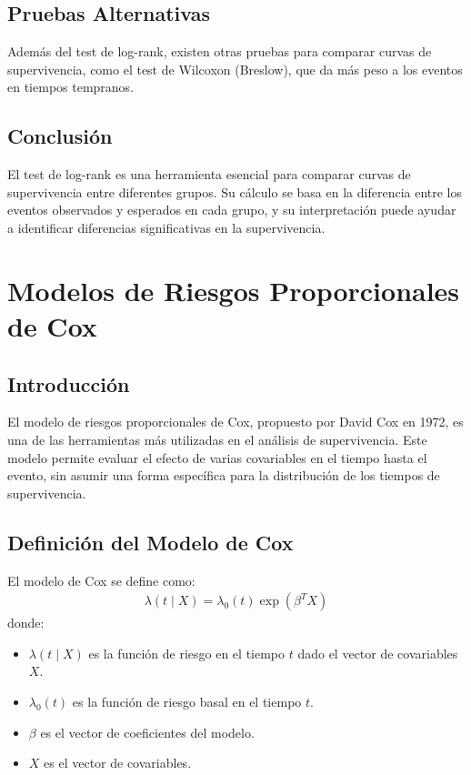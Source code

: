 \documentclass[a4paper]{report} %
\begin{document}
\section{Pruebas Alternativas}
Adem\'as del test de log-rank, existen otras pruebas para comparar curvas de supervivencia, como el test de Wilcoxon (Breslow), que da m\'as peso a los eventos en tiempos tempranos.

\section{Conclusi\'on}
El test de log-rank es una herramienta esencial para comparar curvas de supervivencia entre diferentes grupos. Su c\'alculo se basa en la diferencia entre los eventos observados y esperados en cada grupo, y su interpretaci\'on puede ayudar a identificar diferencias significativas en la supervivencia.



\chapter{Modelos de Riesgos Proporcionales de Cox}

\section{Introducci\'on}
El modelo de riesgos proporcionales de Cox, propuesto por David Cox en 1972, es una de las herramientas m\'as utilizadas en el an\'alisis de supervivencia. Este modelo permite evaluar el efecto de varias covariables en el tiempo hasta el evento, sin asumir una forma espec\'ifica para la distribuci\'on de los tiempos de supervivencia.

\section{Definici\'on del Modelo de Cox}
El modelo de Cox se define como:
\begin{eqnarray*}
\lambda(t \mid X) = \lambda_0(t) \exp(\beta^T X)
\end{eqnarray*}
donde:
\begin{itemize}
    \item $\lambda(t \mid X)$ es la funci\'on de riesgo en el tiempo $t$ dado el vector de covariables $X$.
    \item $\lambda_0(t)$ es la funci\'on de riesgo basal en el tiempo $t$.
    \item $\beta$ es el vector de coeficientes del modelo.
    \item $X$ es el vector de covariables.
\end{itemize}
\end{document}
